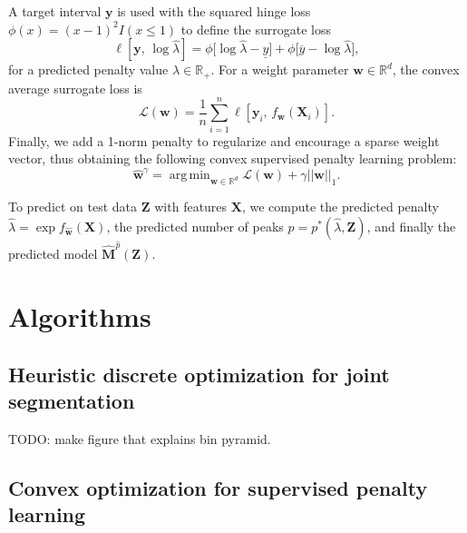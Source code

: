 \documentclass{article} %
\DeclareMathOperator*{\argmin}{arg\,min}
\newcommand{\RR}{\mathbb R}
\begin{document}
A target interval $\mathbf y$ is used with the squared hinge loss
$\phi(x)=(x-1)^2 I(x\leq 1)$ to define the surrogate loss
\begin{equation}
  \label{eq:surrogate_loss}
  \ell\left[
    \mathbf y,\,
    \log \hat \lambda
    \right]
    =
    \phi\big[
      \log\hat\lambda - \underline y
    \big]
    +
    \phi\big[
    \overline y - \log\hat\lambda
    \big],
\end{equation}
for a predicted penalty value $\hat \lambda\in\RR_+$. For a weight parameter
$\mathbf w\in\RR^d$, the convex average surrogate loss is
\begin{equation}
  \label{eq:average_surrogate}
  \mathcal L(\mathbf w) =
  \frac 1 n
  \sum_{i=1}^n
  \ell\left[
    \mathbf y_i,\,
     f_{\mathbf w}( \mathbf X_i )
    \right].
\end{equation}
Finally, we add a 1-norm penalty to regularize and encourage a sparse
weight vector, thus obtaining the following convex supervised penalty
learning problem:
\begin{equation}
  \label{argmin_w}
  \mathbf{\hat w}^\gamma = 
  \argmin_{\mathbf w\in\RR^d}
  \mathcal L(\mathbf w) + \gamma ||\mathbf w||_1.
\end{equation}

To predict on test data $\mathbf Z$ with features $\mathbf
X$, we compute the predicted penalty $\hat \lambda = \exp
f_{\mathbf{\hat w}}(\mathbf X)$, the predicted number of
peaks $\hat p = p^*(\hat \lambda, \mathbf Z)$, and finally the
predicted model $\mathbf{\hat M}^{\hat p}(\mathbf Z)$.

\section{Algorithms}

\subsection{Heuristic discrete optimization for joint segmentation}

TODO: make figure that explains bin pyramid.

\subsection{Convex optimization for supervised penalty learning}
\end{document}
